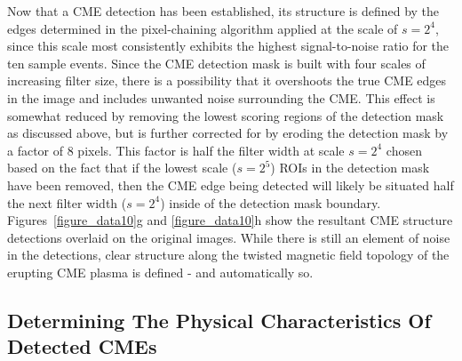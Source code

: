 \documentclass[preprint2]{aastex}
\begin{document}
Now that a CME detection has been established, its structure is defined by the edges determined in the pixel-chaining algorithm applied at the scale of $s=2^{4}$, since this scale most consistently exhibits the highest signal-to-noise ratio for the ten sample events. Since the CME detection mask is built with four scales of increasing filter size, there is a possibility that it overshoots the true CME edges in the image and includes unwanted noise surrounding the CME. This effect is somewhat reduced by removing the lowest scoring regions of the detection mask as discussed above, but is further corrected for by eroding the detection mask by a factor of 8 pixels. This factor is half the filter width at scale $s=2^{4}$ chosen based on the fact that if the lowest scale ($s=2^{5}$) ROIs in the detection mask have been removed, then the CME edge being detected will likely be situated half the next filter width ($s=2^{4}$) inside of the detection mask boundary. Figures~\ref{figure_data10}g and \ref{figure_data10}h show the resultant CME structure detections overlaid on the original images. While there is still an element of noise in the detections, clear structure along the twisted magnetic field topology of the erupting CME plasma is defined - and automatically so.



\subsection{Determining The Physical Characteristics Of Detected CMEs}
\label{sect_kins}
\end{document}

